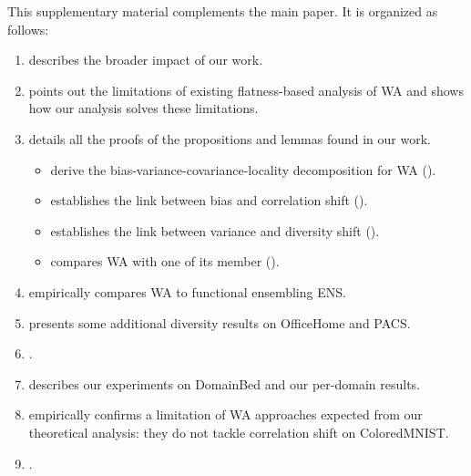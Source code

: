 
This supplementary material complements the main paper.
It is organized as follows:
\begin{enumerate}
    \item {} describes the broader impact of our work.
    \item {} points out the limitations of existing flatness-based analysis of WA and shows how our analysis solves these limitations.
    \item {} details all the proofs of the propositions and lemmas found in our work.
        \begin{itemize}
            \item {} derive the bias-variance-covariance-locality decomposition for WA ().
            \item {} establishes the link between bias and correlation shift ().
            \item {} establishes the link between variance and diversity shift ().
            \item {} compares WA with one of its member ().
        \end{itemize}
    \item {} empirically compares WA to functional ensembling ENS.
    \item {} presents some additional diversity results on OfficeHome and PACS.
    \item {}.
    \item {} describes our experiments on DomainBed and our per-domain results.
    \item {} empirically confirms a limitation of WA approaches expected from our theoretical analysis: they do not tackle correlation shift on ColoredMNIST.
    \item {}.
\end{enumerate}

